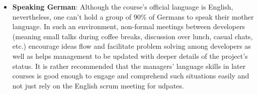 \begin{itemize}
  \item \textbf{Speaking German}: Although the course's official language is English, nevertheless, one can't hold a group of 90\% of Germans to speak their mother language. In such an environment, non-formal meetings between developers (meaning small talks during coffee breaks, discussion over lunch, casual chats, etc.) encourage ideas flow and facilitate problem solving among developers as well as helps management to be updated with deeper details of the project's status. It is rather recommended that the managers' language skills in later courses is good enough to engage and comprehend such situations easily and not just rely on the English scrum meeting for udpates.
\end{itemize}


